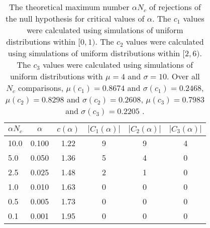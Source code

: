 \begin{table}[h!]
\begin{center}
\begin{tabular}{| l | c | c | c | c | c |}\hline
$\alpha N_c$ & $\alpha$ & $c(\alpha)$ & $|C_1(\alpha)|$ & $|C_2(\alpha)|$ & $|C_3(\alpha)|$ \\\hline
10.0 & 0.100 & 1.22 & 9 & 9 & 4 \\\hline
5.0 & 0.050 & 1.36 & 5 & 4 & 0 \\\hline
2.5 & 0.025 & 1.48 & 2 & 1 & 0 \\\hline
1.0 & 0.010 & 1.63 & 0 & 0 & 0 \\\hline
0.5 & 0.005 & 1.73 & 0 & 0 & 0 \\\hline
0.1 & 0.001 & 1.95 & 0 & 0 & 0 \\\hline
\end{tabular}
\caption{The theoretical maximum number $\alpha N_c$ of rejections
        of the null hypothesis for critical values of $\alpha$.
        The $c_1$ values were calculated using simulations of uniform distributions within $[0,1)$.
        The $c_2$ values were calculated using simulations of uniform distributions within $[2,6)$.
        The $c_3$ values were calculated using simulations of uniform distributions with $\mu=4$ and $\sigma=10$.
        Over all $N_c$ comparisons,
         $\mu(c_1)=0.8674$ and $\sigma(c_1)=0.2468$,
         $\mu(c_2)=0.8298$ and $\sigma(c_2)=0.2608$,
         $\mu(c_3)=0.7983$ and $\sigma(c_3)=0.2205$ .
        }
\end{center}
\end{table}